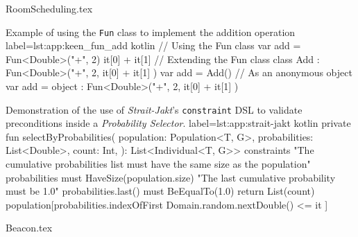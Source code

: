   {RoomScheduling.tex}

  \begin{code}{
    Example of using the \texttt{Fun} class to implement the addition 
    operation
  }{
    label=lst:app:keen_fun_add
  }{kotlin}
    // Using the Fun class
    var add = Fun<Double>("+", 2) { it[0] + it[1] }
    // Extending the Fun class
    class Add : Fun<Double>("+", 2, { it[0] + it[1] })
    var add = Add()
    // As an anonymous object
    var add = object : Fun<Double>("+", 2, { it[0] + it[1] }) {}
  \end{code}

  \begin{code}{
    Demonstration of the use of \textit{Strait-Jakt}'s \texttt{constraint} DSL
    to validate preconditions inside a \textit{Probability Selector}.
  }{
    label=lst:app:strait-jakt
  }{kotlin}
    private fun selectByProbabilities(
      population: Population<T, G>,
      probabilities: List<Double>,
      count: Int,
    ): List<Individual<T, G>> {
      constraints {
        "The cumulative probabilities list must have the same size as the population" {
          probabilities must HaveSize(population.size)
        }
        "The last cumulative probability must be 1.0" {
          probabilities.last() must BeEqualTo(1.0)
        }
      }
      return List(count) {
        population[probabilities.indexOfFirst { Domain.random.nextDouble() <= it }]
      }
    }
  \end{code}

  {Beacon.tex}